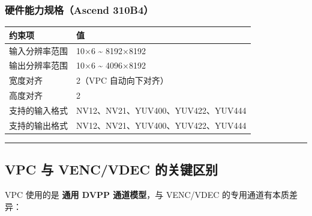 \subsubsection{硬件能力规格（Ascend
310B4）}\label{src-book-chapter6-h86}

\begin{longtable}[]{@{}ll@{}}
\toprule\noalign{}
约束项 & 值 \\
\midrule\noalign{}
\endhead
\bottomrule\noalign{}
\endlastfoot
输入分辨率范围 & 10×6 \textasciitilde{} 8192×8192 \\
输出分辨率范围 & 10×6 \textasciitilde{} 4096×8192 \\
宽度对齐 & 2（VPC 自动向下对齐） \\
高度对齐 & 2 \\
支持的输入格式 & NV12、NV21、YUV400、YUV422、YUV444 \\
支持的输出格式 & NV12、NV21、YUV400、YUV422、YUV444 \\
\end{longtable}

\begin{center}\rule{0.5\linewidth}{0.5pt}\end{center}

\subsection{VPC 与 VENC/VDEC 的关键区别}\label{src-book-chapter6-h87}

VPC 使用的是 \textbf{通用 DVPP 通道模型}，与 VENC/VDEC
的专用通道有本质差异：

